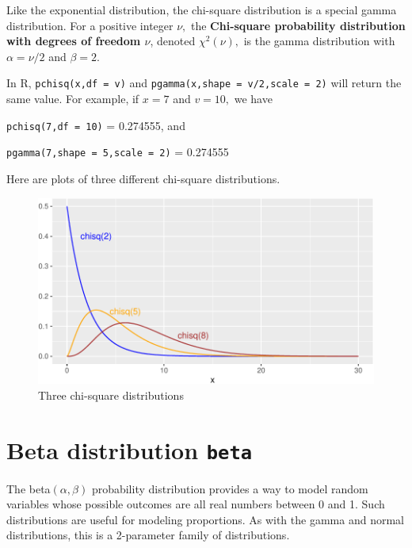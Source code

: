 \documentclass[
]{book}
\theoremstyle{definition}
\theoremstyle{definition}
\theoremstyle{definition}
\theoremstyle{definition}
\theoremstyle{remark}
\begin{document}
Like the exponential distribution, the chi-square distribution is a special gamma distribution. For a positive integer \(\nu,\) the \textbf{Chi-square probability distribution with degrees of freedom \(\nu\)}, denoted \(\chi^2(\nu),\) is the gamma distribution with \(\alpha = \nu/2\) and \(\beta=2\).

In R, \texttt{pchisq(x,df\ =\ v)} and \texttt{pgamma(x,shape\ =\ v/2,scale\ =\ 2)} will return the same value. For example, if \(x = 7\) and \(v = 10,\) we have

\texttt{pchisq(7,df\ =\ 10)} = 0.274555, and

\texttt{pgamma(7,shape\ =\ 5,scale\ =\ 2)} = 0.274555

Here are plots of three different chi-square distributions.

\begin{figure}

{\centering \includegraphics{math340-notes_files/figure-latex/chisq-densities-1} 

}

\caption{Three chi-square distributions}\label{fig:chisq-densities}
\end{figure}

\section{\texorpdfstring{Beta distribution \texttt{beta}}{Beta distribution beta}}\label{betaR}

The beta\((\alpha,\beta)\) probability distribution provides a way to model random variables whose possible outcomes are all real numbers between 0 and 1. Such distributions are useful for modeling proportions. As with the gamma and normal distributions, this is a 2-parameter family of distributions.
\end{document}
